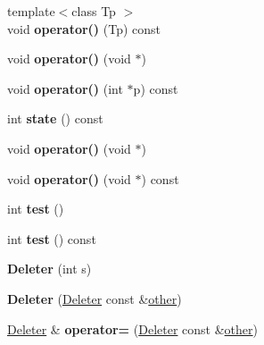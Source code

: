 \begin{DoxyCompactItemize}
\item 
\mbox{\label{struct_deleter_a8b502c79b0d1db131a5fdee5c7c4f80a}} 
{\footnotesize template$<$class Tp $>$ }\\void {\bfseries operator()} (Tp) const
\item 
\mbox{\label{struct_deleter_aefe7d4a093bdf6129679f6f6ce11d21d}} 
void {\bfseries operator()} (void $\ast$)
\item 
\mbox{\label{struct_deleter_a0f7d1846b8aea3854eab1918f2a52fde}} 
void {\bfseries operator()} (int $\ast$p) const
\item 
\mbox{\label{struct_deleter_aacdd533c4b685d1587b28156fa1512f9}} 
int {\bfseries state} () const
\item 
\mbox{\label{struct_deleter_aefe7d4a093bdf6129679f6f6ce11d21d}} 
void {\bfseries operator()} (void $\ast$)
\item 
\mbox{\label{struct_deleter_ae1325f323a876942e6ac4bc63fdcdda2}} 
void {\bfseries operator()} (void $\ast$) const
\item 
\mbox{\label{struct_deleter_acd196ccb40aca648796d9767121e7d93}} 
int {\bfseries test} ()
\item 
\mbox{\label{struct_deleter_a433f2c8a5211866ddf71d5ab3e137957}} 
int {\bfseries test} () const
\item 
\mbox{\label{struct_deleter_a7ecb5154475e2fc927dffbaa8e9a590a}} 
{\bfseries Deleter} (int s)
\item 
\mbox{\label{struct_deleter_a2f0844e73dc2ee73121e17dec1ebafe6}} 
{\bfseries Deleter} (\mbox{\hyperlink{struct_deleter}{Deleter}} const \&\mbox{\hyperlink{structother}{other}})
\item 
\mbox{\label{struct_deleter_aa9e9597f3e1e1830f79cd41618dc5f51}} 
\mbox{\hyperlink{struct_deleter}{Deleter}} \& {\bfseries operator=} (\mbox{\hyperlink{struct_deleter}{Deleter}} const \&\mbox{\hyperlink{structother}{other}})

\end{DoxyCompactItemize}
